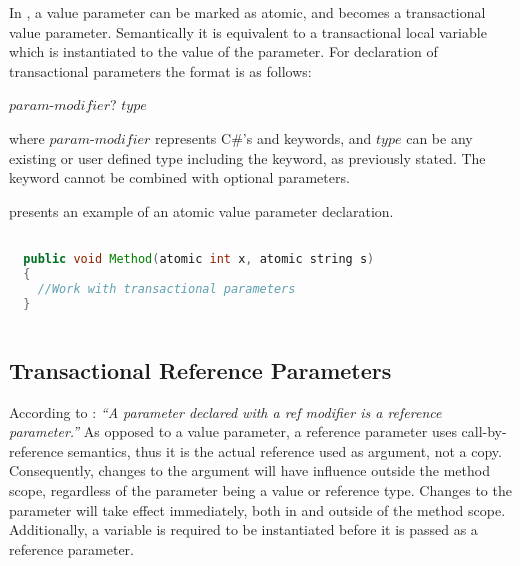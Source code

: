 In \stmnamesp, a value parameter can be marked as atomic, and becomes a transactional value parameter. Semantically it is equivalent to a transactional local variable which is instantiated to the value of the parameter.\cite[p. 76]{sestoft2011c} 
For declaration of transactional parameters the format is as follows:

 $param$-$modifier$? $type$ 

where $param$-$modifier$ represents C\#'s  and  keywords, and $type$ can be any existing or user defined type including the  keyword, as previously stated. The  keyword cannot be combined with optional parameters.

 presents an example of an atomic value parameter declaration.

\begin{lstlisting}[label=lst:design_value_parameter,
  caption={Transactional Value Parameter},
  language=Java,  
  showspaces=false,
  showtabs=false,
  breaklines=true,
  showstringspaces=false,
  breakatwhitespace=true,
  commentstyle=\color{greencomments},
  keywordstyle=\color{bluekeywords},
  stringstyle=\color{redstrings},
  morekeywords={atomic, retry, orElse, var, get, set}]  % Start your code-block

  public void Method(atomic int x, atomic string s)
  {
  	//Work with transactional parameters
  }
    
\end{lstlisting}


\subsection{Transactional Reference Parameters}
According to \cite[p. 97]{csharp2013specificaiton}: \textit{``A parameter declared with a ref modifier is a reference parameter.''} As opposed to a value parameter, a reference parameter uses call-by-reference semantics, thus it is the actual reference used as argument, not a copy. Consequently, changes to the argument will have influence outside the method scope, regardless of the parameter being a value or reference type. Changes to the parameter will take effect immediately, both in and outside of the method scope\cite[p. 42]{sestoft2011c}. Additionally, a variable is required to be instantiated before it is passed as a reference parameter\cite[p. 97]{csharp2013specificaiton}.

